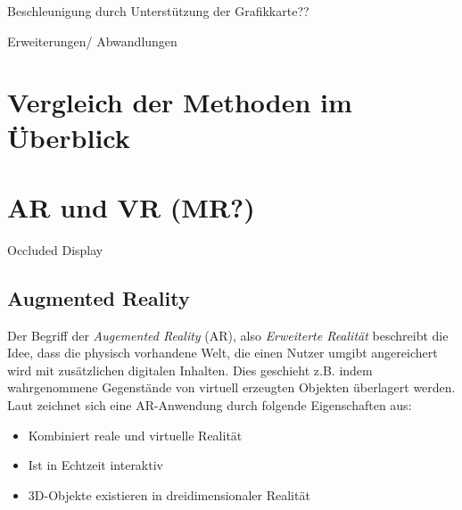 Beschleunigung durch Unterstützung der Grafikkarte??

Erweiterungen/ Abwandlungen


\section{Vergleich der Methoden im Überblick}											 %

\section{AR und VR (MR?)}									 %
Occluded Display 

\subsection{Augmented Reality}

Der Begriff der \textit{Augemented Reality} (AR), also \textit{Erweiterte Realität} beschreibt die Idee, dass die physisch vorhandene Welt, die einen Nutzer umgibt angereichert wird mit zusätzlichen digitalen Inhalten. Dies geschieht z.B. indem wahrgenommene Gegenstände von virtuell erzeugten Objekten überlagert werden. 
Laut \cite{azuma97} zeichnet sich eine AR-Anwendung durch folgende Eigenschaften aus:

\begin{itemize}
\item Kombiniert reale und virtuelle Realität
\item Ist in Echtzeit interaktiv
\item 3D-Objekte existieren in dreidimensionaler Realität
\end{itemize}

